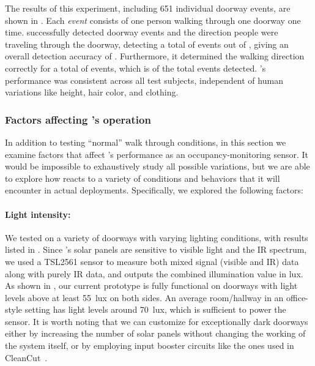 The results of this experiment, including 651 individual doorway events, are shown in .
Each \textit{event} consists of one person walking through one doorway one time.
\sysname successfully detected doorway events and the direction people were traveling through the doorway, detecting a total of \numDet events out of \numExp, giving an overall detection accuracy of \SysAccuracy.
Furthermore, it determined the walking direction correctly for a total of \numDir events, which is \dirAccuracy of the total events detected.
\sysname's performance was consistent across all test subjects, independent of human variations like height, hair color, and clothing.



\subsubsection{Factors affecting \sysname's operation}
\label{sec:confounding}

In addition to testing ``normal'' walk through conditions, in this section we examine factors that affect \sysname's performance as an occupancy-monitoring sensor.
It would be impossible to exhaustively study all possible variations, but we are able to explore how \sysname reacts to a variety of conditions and behaviors that it will encounter in actual deployments.
Specifically, we explored the following factors:


\paragraph{Light intensity:}
We tested \sysname on a variety of doorways with varying lighting conditions, with results listed in . 
Since \sysname's solar panels are sensitive to visible light and the IR spectrum, we used a TSL2561 sensor to measure both mixed signal (visible and IR) data along with purely IR data, and outputs the combined illumination value in lux.
As shown in , our current prototype is fully functional on doorways with light levels above at least 55~lux on both sides.
An average room/hallway in an office-style setting has light levels around 70~lux, which is sufficient to power the \sysname sensor.
It is worth noting that we can customize \sysname for exceptionally dark doorways either by increasing the number of solar panels without changing the working of the system itself, or by employing input booster circuits like the ones used in CleanCut~\cite{colin2018cleancut}.

